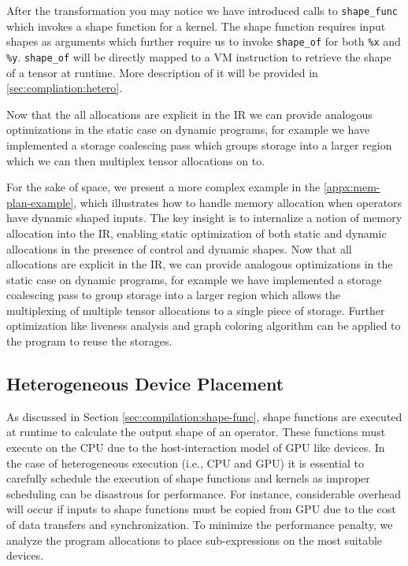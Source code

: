 After the transformation you may notice we have introduced calls to \verb|shape_func| which
  invokes a shape function for a kernel.
The shape function requires input shapes as arguments which further require us to invoke \verb|shape_of|
  for both \verb|%x| and \verb|%y|.
\verb|shape_of| will be directly mapped to a VM instruction to retrieve the shape of a tensor at runtime.
More description of it will be provided in \autoref{sec:compliation:hetero}.

Now that the all allocations are explicit in the IR we can provide analogous optimizations in the static
case on dynamic programs, for example we have implemented a storage coalescing pass which groups storage
into a larger region which we can then multiplex tensor allocations on to.

For the sake of space, we present a more complex example in the \autoref{appx:mem-plan-example},
  which illustrates how to handle memory allocation when operators have dynamic shaped inputs.
The key insight is to internalize a notion of memory allocation into the IR,
  enabling static optimization of both static and dynamic allocations in the presence of control and dynamic shapes.
Now that all allocations are explicit in the IR, we can provide analogous optimizations in the static case on dynamic programs,
  for example we have implemented a storage coalescing pass to group storage
  into a larger region which allows the multiplexing of multiple tensor allocations to a single piece of storage.
Further optimization like liveness analysis and graph coloring algorithm can be applied to the program to reuse the storages.

\subsection{Heterogeneous Device Placement}
\label{sec:optimizations:hetero}

As discussed in Section \autoref{sec:compilation:shape-func}, shape functions are executed at runtime to
  calculate the output shape of an operator.
These functions must execute on the CPU due to the host-interaction model of GPU like devices.
In the case of heterogeneous execution (i.e., CPU and GPU) it is essential to carefully schedule
  the execution of shape functions and kernels as improper scheduling can be disastrous for performance.
For instance, considerable overhead will occur if inputs to shape functions must be copied from
  GPU due to the cost of data transfers and synchronization.
To minimize the performance penalty, we analyze the program allocations to place sub-expressions on the most suitable devices.

